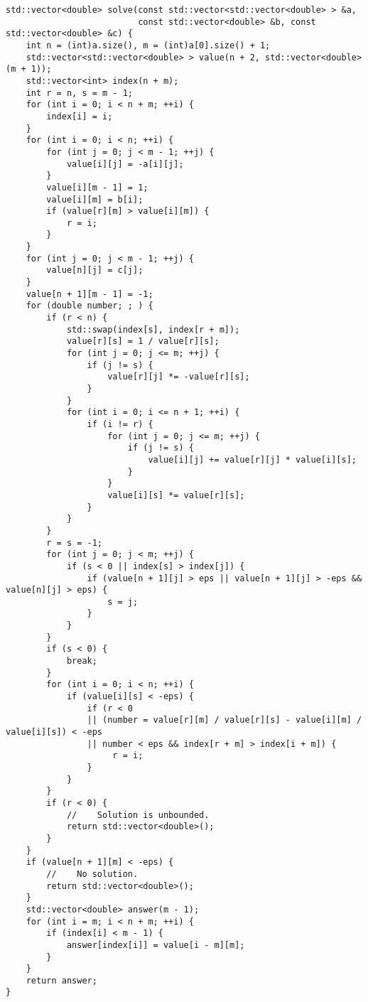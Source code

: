 \begin{lstlisting}
std::vector<double> solve(const std::vector<std::vector<double> > &a, 
                          const std::vector<double> &b, const std::vector<double> &c) {
    int n = (int)a.size(), m = (int)a[0].size() + 1;
    std::vector<std::vector<double> > value(n + 2, std::vector<double>(m + 1));
    std::vector<int> index(n + m);
    int r = n, s = m - 1;
    for (int i = 0; i < n + m; ++i) {
        index[i] = i;
    }
    for (int i = 0; i < n; ++i) {
        for (int j = 0; j < m - 1; ++j) {
            value[i][j] = -a[i][j];
        }
        value[i][m - 1] = 1;
        value[i][m] = b[i];
        if (value[r][m] > value[i][m]) {
            r = i;
        }
    }
    for (int j = 0; j < m - 1; ++j) {
        value[n][j] = c[j];
    }
    value[n + 1][m - 1] = -1;
    for (double number; ; ) {
        if (r < n) {
            std::swap(index[s], index[r + m]);
            value[r][s] = 1 / value[r][s];
            for (int j = 0; j <= m; ++j) {
                if (j != s) {
                    value[r][j] *= -value[r][s];
                }
            }
            for (int i = 0; i <= n + 1; ++i) {
                if (i != r) {
                    for (int j = 0; j <= m; ++j) {
                        if (j != s) {
                            value[i][j] += value[r][j] * value[i][s];
                        }
                    }
                    value[i][s] *= value[r][s];
                }
            }
        }
        r = s = -1;
        for (int j = 0; j < m; ++j) {
            if (s < 0 || index[s] > index[j]) {
                if (value[n + 1][j] > eps || value[n + 1][j] > -eps && value[n][j] > eps) {
                    s = j;
                }
            }
        }
        if (s < 0) {
            break;
        }
        for (int i = 0; i < n; ++i) {
            if (value[i][s] < -eps) {
                if (r < 0
                || (number = value[r][m] / value[r][s] - value[i][m] / value[i][s]) < -eps
                || number < eps && index[r + m] > index[i + m]) {
                     r = i;
                }
            }
        }
        if (r < 0) {
            //    Solution is unbounded.
            return std::vector<double>();
        }
    }
    if (value[n + 1][m] < -eps) {
        //    No solution.
        return std::vector<double>();
    }
    std::vector<double> answer(m - 1);
    for (int i = m; i < n + m; ++i) {
        if (index[i] < m - 1) {
            answer[index[i]] = value[i - m][m];
        }
    }
    return answer;
}
\end{lstlisting}
